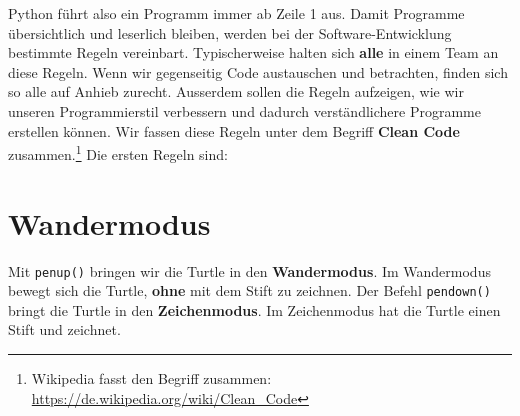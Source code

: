 Python führt also ein Programm immer ab Zeile 1 aus.
Damit Programme übersichtlich und leserlich bleiben, werden bei der Software-Entwicklung bestimmte Regeln vereinbart.
Typischerweise halten sich \textbf{alle} in einem Team an diese Regeln.
Wenn wir gegenseitig Code austauschen und betrachten, finden sich so alle auf Anhieb zurecht.
Ausserdem sollen die Regeln aufzeigen, wie wir unseren Programmierstil verbessern und dadurch verständlichere Programme erstellen können.
Wir fassen diese Regeln unter dem Begriff \textbf{Clean Code} zusammen.\footnote{Wikipedia fasst den Begriff  zusammen: \url{https://de.wikipedia.org/wiki/Clean_Code}} Die ersten Regeln sind:




\section{Wandermodus}

Mit \lstinline[language={python3}]{penup()} bringen wir die Turtle in den \textbf{Wandermodus}.
Im Wandermodus bewegt sich die Turtle, \textbf{ohne} mit dem Stift zu zeichnen.
Der Befehl \lstinline[language={python3}]{pendown()} bringt die Turtle in den \textbf{Zeichenmodus}.
Im Zeichenmodus hat die Turtle einen Stift und zeichnet.

